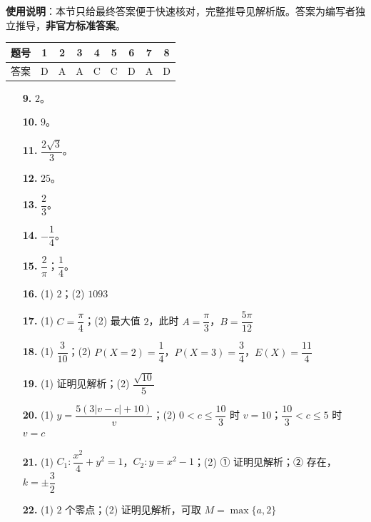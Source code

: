 
\begin{gknotice}
\textbf{使用说明}：本节只给最终答案便于快速核对，完整推导见解析版。答案为编写者独立推导，\textbf{非官方标准答案}。
\end{gknotice}

\begin{center}\begin{tabular}{ccccccccc}
\toprule
题号 & 1 & 2 & 3 & 4 & 5 & 6 & 7 & 8 \\
\midrule
答案 & D & A & A & C & C & D & A & D \\
\bottomrule
\end{tabular}\end{center}

\begin{itemize}[leftmargin=2.6em]
  \item[\textbf{9.}] $2$。
  \item[\textbf{10.}] $9$。
  \item[\textbf{11.}] $\dfrac{2\sqrt3}3$。
  \item[\textbf{12.}] $25$。
  \item[\textbf{13.}] $\dfrac23$。
  \item[\textbf{14.}] $-\dfrac14$。
  \item[\textbf{15.}] $\dfrac2\pi$；$\dfrac14$。
  \item[\textbf{16.}] (1) $2$；(2) $1093$
\end{itemize}

\begin{itemize}[leftmargin=2.6em]
  \item[\textbf{17.}] (1) $C=\dfrac\pi4$；(2) 最大值 $2$，此时 $A=\dfrac\pi3$，$B=\dfrac{5\pi}{12}$
  \item[\textbf{18.}] (1) $\dfrac3{10}$；(2) $P(X=2)=\dfrac14$，$P(X=3)=\dfrac34$，$E(X)=\dfrac{11}4$
  \item[\textbf{19.}] (1) 证明见解析；(2) $\dfrac{\sqrt{10}}5$
  \item[\textbf{20.}] (1) $y=\dfrac{5(3|v-c|+10)}v$；(2) $0<c\leqslant\dfrac{10}3$ 时 $v=10$；$\dfrac{10}3<c\leqslant5$ 时 $v=c$
  \item[\textbf{21.}] (1) $C_1:\dfrac{x^2}4+y^2=1$，$C_2:y=x^2-1$；(2) ① 证明见解析；② 存在，$k=\pm\dfrac32$
  \item[\textbf{22.}] (1) $2$ 个零点；(2) 证明见解析，可取 $M=\max\{a,2\}$
\end{itemize}
